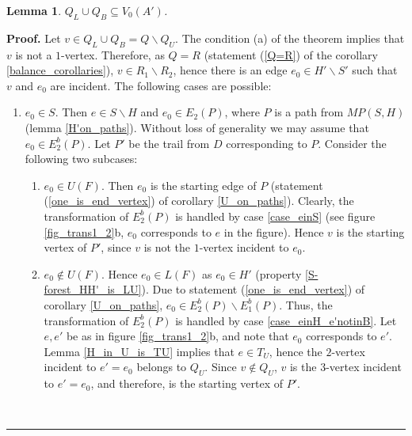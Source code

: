 \documentclass[a4paper, 12pt]{article}
\newtheorem{lemma}{Lemma}[subsection]
\newenvironment{proof}[1][Proof]{\noindent\textbf{#1.} }{\ \rule{0.5em}{0.5em}}
\begin{document}
\begin{lemma} \label{Q_LcupQ_B_in_endvertices_of_A'}
$Q_L \cup Q_B \subseteq V_0(A')$.
\end{lemma}
\begin{proof}
Let $v \in Q_L \cup Q_B = Q \backslash Q_U$. The condition (a) of
the theorem implies that $v$ is not a $1$-vertex. Therefore, as $Q =
R$ (statement (\ref{Q=R}) of the corollary
\ref{balance_corollaries}), $v \in R_1 \backslash R_2$, hence there
is an edge $e_0 \in H' \backslash S'$ such that $v$ and $e_0$ are
incident. The following cases are possible:

\renewcommand{\labelenumi}{(\arabic{enumi})}
\begin{enumerate}
\item \textbf{$e_0 \in S$}. Then $e \in S \backslash H$ and $e_0 \in E_2(P)$, where $P$ is a path
from $MP(S,H)$ (lemma \ref{H'on_paths}). Without loss of generality
we may assume that $e_0 \in E_2^b(P)$. Let $P'$ be the trail from
$D$ corresponding to $P$. Consider the following two subcases:
\begin{enumerate}
\item \textbf{$e_0 \in U(F)$}. Then $e_0$ is the starting edge of $P$
(statement (\ref{one_is_end_vertex}) of corollary \ref{U_on_paths}).
Clearly, the transformation of $E_2^b(P)$ is handled by case
\ref{case_einS} (see figure \ref{fig_trans1_2}b, $e_0$ corresponds
to $e$ in the figure). Hence $v$ is the starting vertex of $P'$,
since $v$ is not the $1$-vertex incident to $e_0$.

\item \textbf{$e_0 \notin U(F)$}. Hence $e_0 \in L(F)$ as $e_0 \in H'$ (property \ref{S-forest_HH'_is_LU}).
Due to statement (\ref{one_is_end_vertex}) of corollary
\ref{U_on_paths}, $e_0 \in E_2^b(P) \backslash E_1^b(P)$. Thus, the
transformation of $E_2^b(P)$ is handled by case
\ref{case_einH_e'notinB}. Let $e, e'$ be as in figure
\ref{fig_trans1_2}b, and note that $e_0$ corresponds to $e'$. Lemma
\ref{H_in_U_is_TU} implies that $e \in T_U$, hence the $2$-vertex
incident to $e'=e_0$ belongs to $Q_U$. Since $v \notin Q_U$, $v$ is
the $3$-vertex incident to $e'=e_0$, and therefore, is the starting
vertex of $P'$.
\end{enumerate}



\end{enumerate}
\end{proof}
\end{document}
